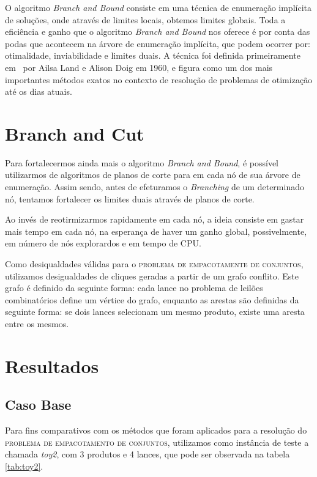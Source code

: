 \documentclass{article}
\begin{document}
	O algoritmo \emph{Branch and Bound} consiste em uma técnica de enumeração implícita de soluções, onde através de limites locais, obtemos limites globais. Toda a eficiência e ganho que o algoritmo \emph{Branch and Bound} nos oferece é por conta das podas que acontecem na árvore de enumeração implícita, que podem ocorrer por: otimalidade, inviabilidade e limites duais. A técnica foi definida primeiramente em~\cite{Land} por Ailsa Land e Alison Doig em 1960, e figura como um dos mais importantes métodos exatos no contexto de resolução de problemas de otimização até os dias atuais.
	
	
	
	\section{Branch and Cut}\label{sec:BC}
	Para fortalecermos ainda mais o algoritmo \emph{Branch and Bound}, é possível utilizarmos de algoritmos de planos de corte para em cada nó de sua árvore de enumeração. %
	Assim sendo, antes de efeturamos o \emph{Branching} de um determinado nó, tentamos fortalecer os limites duais através de planos de corte. 
	
	Ao invés de reotirmizarmos rapidamente em cada nó, a ideia consiste em gastar mais tempo em cada nó, na esperança de haver um ganho global, possivelmente, em número de nós explorardos e em tempo de CPU. %
	
	Como desiqualdades válidas para o \textsc{problema de empacotamente de conjuntos}, utilizamos desigualdades de cliques geradas a partir de um grafo conflito. Este grafo é definido da seguinte forma: cada lance no problema de leilões combinatórios define um vértice do grafo, enquanto as arestas são definidas da seguinte forma: se dois lances selecionam um mesmo produto, existe uma aresta entre os mesmos. 
	
	
	\section{Resultados}\label{sec:res}
	
		\subsection{Caso Base} \label{sec:caso}
	    Para fins comparativos com os métodos que foram aplicados para a resolução do \textsc{problema de empacotamento de conjuntos}, utilizamos como instância de teste a chamada \textit{toy2}, com 3 produtos e 4 lances, que pode ser observada na tabela \ref{tab:toy2}.
	    
\end{document}
